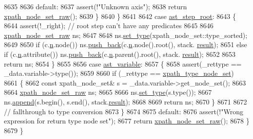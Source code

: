 \begin{DoxyCode}
8635 
8636                 \textcolor{keywordflow}{default}:
8637                     assert(!\textcolor{stringliteral}{"Unknown axis"});
8638                     \textcolor{keywordflow}{return} \hyperlink{classxpath__node__set__raw}{xpath\_node\_set\_raw}();
8639                 \}
8640             \}
8641 
8642             \textcolor{keywordflow}{case} \hyperlink{pugixml_8cpp_a11258a240266b84b6b0526930e5d330dabee572296f3d4f85d8ebfffca4c2d3bd}{ast\_step\_root}:
8643             \{
8644                 assert(!\_right); \textcolor{comment}{// root step can't have any predicates}
8645 
8646                 \hyperlink{classxpath__node__set__raw}{xpath\_node\_set\_raw} ns;
8647 
8648                 ns.\hyperlink{classxpath__node__set__raw_ae73780271d772967f78ddd7b9376cdab}{set\_type}(xpath\_node\_set::type\_sorted);
8649 
8650                 \textcolor{keywordflow}{if} (c.\hyperlink{structxpath__context_ace8fbb8121820bc5054605c166101273}{n}.node()) ns.\hyperlink{classxpath__node__set__raw_a676ec123e5be874869c78ff5c43ae9c2}{push\_back}(c.\hyperlink{structxpath__context_ace8fbb8121820bc5054605c166101273}{n}.node().root(), stack.
      \hyperlink{structxpath__stack_adce164b779cbb3d1bc093a772067ea7e}{result});
8651                 \textcolor{keywordflow}{else} \textcolor{keywordflow}{if} (c.\hyperlink{structxpath__context_ace8fbb8121820bc5054605c166101273}{n}.attribute()) ns.\hyperlink{classxpath__node__set__raw_a676ec123e5be874869c78ff5c43ae9c2}{push\_back}(c.\hyperlink{structxpath__context_ace8fbb8121820bc5054605c166101273}{n}.parent().root(), stack.
      \hyperlink{structxpath__stack_adce164b779cbb3d1bc093a772067ea7e}{result});
8652 
8653                 \textcolor{keywordflow}{return} ns;
8654             \}
8655 
8656             \textcolor{keywordflow}{case} \hyperlink{pugixml_8cpp_a11258a240266b84b6b0526930e5d330da3e16540ee352944686b90794e0c94260}{ast\_variable}:
8657             \{
8658                 assert(\_rettype == \_data.variable->type());
8659 
8660                 \textcolor{keywordflow}{if} (\_rettype == \hyperlink{namespacepugi_ae3820874caf240e9f311bfd2790a84d6af5613748204e2e4861524e7d63a699c9}{xpath\_type\_node\_set})
8661                 \{
8662                     \textcolor{keyword}{const} xpath\_node\_set& s = \_data.variable->get\_node\_set();
8663 
8664                     \hyperlink{classxpath__node__set__raw}{xpath\_node\_set\_raw} ns;
8665 
8666                     ns.\hyperlink{classxpath__node__set__raw_ae73780271d772967f78ddd7b9376cdab}{set\_type}(s.type());
8667                     ns.\hyperlink{classxpath__node__set__raw_a0c02728de3d895a2d12df9666d60e414}{append}(s.begin(), s.end(), stack.\hyperlink{structxpath__stack_adce164b779cbb3d1bc093a772067ea7e}{result});
8668 
8669                     \textcolor{keywordflow}{return} ns;
8670                 \}
8671 
8672                 \textcolor{comment}{// fallthrough to type conversion}
8673             \}
8674 
8675             \textcolor{keywordflow}{default}:
8676                 assert(!\textcolor{stringliteral}{"Wrong expression for return type node set"});
8677                 \textcolor{keywordflow}{return} \hyperlink{classxpath__node__set__raw}{xpath\_node\_set\_raw}();
8678             \}
8679         \}
\end{DoxyCode}
